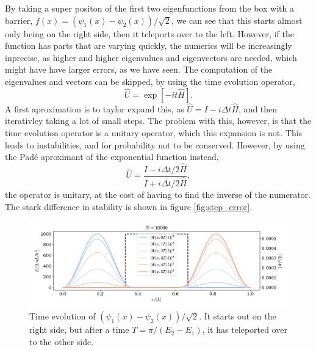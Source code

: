 \documentclass{article}
\begin{document}
    By taking a super positon of the first two eigenfunctions from the box with a barrier, $f(x) = (\psi_1(x) - \psi_2(x))/\sqrt{2}$, we can see that this starts almost only being on the right side, then it teleports over to the left. However, if the function has parts that are varying quickly, the numerics will be increasingly inprecise, as higher and higher eigenvalues and eigenvectors are needed, which might have have larger errors, as we have seen. The computation of the eigenvalues and vectors can be skipped, by using the time evolution operator,
    \begin{equation*}
        \hat U = \exp[-it\hat H].
    \end{equation*}
    A first aproximation is to taylor expand this, as $\hat U = I - i\Delta t\hat H$, and then iterativley taking a lot of small steps. The problem with this, however, is that the time evolution operator is a unitary operator, which this expansion is not. This leads to instabilities, and for probability not to be conserved. However, by using the Padé aproximant of the exponential function instead,
    \begin{equation*}
        \hat U = \frac{ I - i\Delta t/2\hat H}{ I + i\Delta t/2\hat H},
    \end{equation*}
    the operator is unitary, at the cost of having to find the inverse of the numerator. The stark difference in stability is shown in figure \ref{fig:step_error}.


    \begin{figure}[ht]
        \centering
        \includegraphics[width=\textwidth]{box_w_barrier/time_evolve.pdf}
        \caption{Time evolution of $(\psi_1(x) - \psi_2(x))/\sqrt{2}$. It starts out on the right side, but after a time $T=\pi/(E_2-E_1)$, it has teleported over to the other side.}
    \end{figure}
\end{document}
